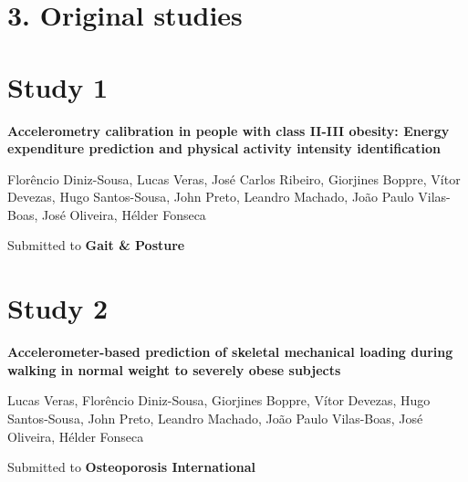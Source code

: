 \documentclass[12pt]{article}
\def\blankpage{%
      \clearpage%
      \thispagestyle{empty}%
      \addtocounter{page}{+0}%
      \null%
      \clearpage}
\begin{document}
\pagebreak
{}
\blankpage

\section*{\vfill\raggedleft\bfseries 3. Original studies}
\thispagestyle{empty} 
\blankpage

\section*{\vfill\raggedleft\bfseries Study 1}
\noindent \textbf{Accelerometry calibration in people with class II-III obesity: Energy expenditure prediction and physical activity intensity identification}

\bigskip

\noindent Florêncio Diniz-Sousa, Lucas Veras, José Carlos Ribeiro, Giorjines Boppre, Vítor Devezas, Hugo Santos-Sousa, John Preto, Leandro Machado, João Paulo Vilas-Boas, José Oliveira, Hélder Fonseca

\bigskip

\noindent Submitted to \textbf{Gait \& Posture}
\thispagestyle{empty}
\blankpage


\pagebreak

\section*{\vfill\raggedleft\bfseries Study 2}
\noindent \textbf{Accelerometer-based prediction of skeletal mechanical loading during walking in normal weight to severely obese subjects}

\bigskip

\noindent Lucas Veras, Florêncio Diniz-Sousa, Giorjines Boppre, Vítor Devezas, Hugo Santos-Sousa, John Preto, Leandro Machado, João Paulo Vilas-Boas, José Oliveira, Hélder Fonseca

\bigskip

\noindent Submitted to \textbf{Osteoporosis International}
\end{document}
